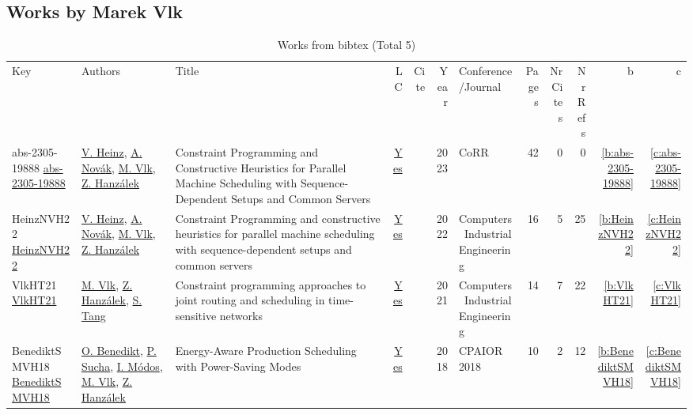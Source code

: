 \subsection{Works by Marek Vlk}
\label{sec:a314}
{\scriptsize
\begin{longtable}{>{\raggedright\arraybackslash}p{3cm}>{\raggedright\arraybackslash}p{6cm}>{\raggedright\arraybackslash}p{6.5cm}rrrp{2.5cm}rrrrr}
\rowcolor{white}\caption{Works from bibtex (Total 5)}\\ \toprule
\rowcolor{white}Key & Authors & Title & LC & Cite & Year & \shortstack{Conference\\/Journal} & Pages & \shortstack{Nr\\Cites} & \shortstack{Nr\\Refs} & b & c \\ \midrule\endhead
\bottomrule
\endfoot
abs-2305-19888 \href{https://doi.org/10.48550/arXiv.2305.19888}{abs-2305-19888} & \hyperref[auth:a439]{V. Heinz}, \hyperref[auth:a440]{A. Nov{\'{a}}k}, \hyperref[auth:a314]{M. Vlk}, \hyperref[auth:a116]{Z. Hanz{\'{a}}lek} & Constraint Programming and Constructive Heuristics for Parallel Machine Scheduling with Sequence-Dependent Setups and Common Servers & \href{works/abs-2305-19888.pdf}{Yes} & \cite{abs-2305-19888} & 2023 & CoRR & 42 & 0 & 0 & \ref{b:abs-2305-19888} & \ref{c:abs-2305-19888}\\
HeinzNVH22 \href{https://doi.org/10.1016/j.cie.2022.108586}{HeinzNVH22} & \hyperref[auth:a439]{V. Heinz}, \hyperref[auth:a440]{A. Nov{\'{a}}k}, \hyperref[auth:a314]{M. Vlk}, \hyperref[auth:a116]{Z. Hanz{\'{a}}lek} & Constraint Programming and constructive heuristics for parallel machine scheduling with sequence-dependent setups and common servers & \href{works/HeinzNVH22.pdf}{Yes} & \cite{HeinzNVH22} & 2022 & Computers \  Industrial Engineering & 16 & 5 & 25 & \ref{b:HeinzNVH22} & \ref{c:HeinzNVH22}\\
VlkHT21 \href{https://doi.org/10.1016/j.cie.2021.107317}{VlkHT21} & \hyperref[auth:a314]{M. Vlk}, \hyperref[auth:a116]{Z. Hanz{\'{a}}lek}, \hyperref[auth:a482]{S. Tang} & Constraint programming approaches to joint routing and scheduling in time-sensitive networks & \href{works/VlkHT21.pdf}{Yes} & \cite{VlkHT21} & 2021 & Computers \  Industrial Engineering & 14 & 7 & 22 & \ref{b:VlkHT21} & \ref{c:VlkHT21}\\
BenediktSMVH18 \href{https://doi.org/10.1007/978-3-319-93031-2\_6}{BenediktSMVH18} & \hyperref[auth:a114]{O. Benedikt}, \hyperref[auth:a313]{P. Sucha}, \hyperref[auth:a115]{I. M{\'{o}}dos}, \hyperref[auth:a314]{M. Vlk}, \hyperref[auth:a116]{Z. Hanz{\'{a}}lek} & Energy-Aware Production Scheduling with Power-Saving Modes & \href{works/BenediktSMVH18.pdf}{Yes} & \cite{BenediktSMVH18} & 2018 & CPAIOR 2018 & 10 & 2 & 12 & \ref{b:BenediktSMVH18} & \ref{c:BenediktSMVH18}\\

\end{longtable}}
